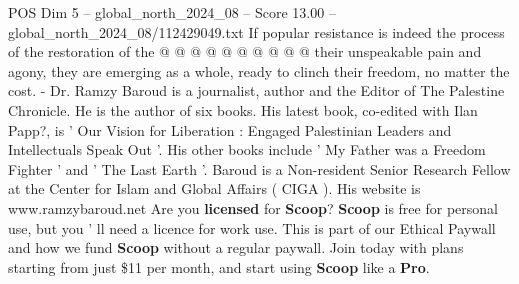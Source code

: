 \begin{textsample}{POS Dim 5 – global\_north\_2024\_08 – Score 13.00 – global\_north\_2024\_08/112429049.txt}
If popular resistance is indeed the process of the restoration of the @ @ @ @ @ @ @ @ @ @ their unspeakable pain and agony, they are emerging as a whole, ready to clinch their freedom, no matter the cost. - Dr.
Ramzy Baroud is a journalist, author and the Editor of The Palestine Chronicle.
He is the author of six books.
His latest book, co-edited with Ilan Papp?, is ' Our Vision for Liberation : Engaged Palestinian Leaders and Intellectuals Speak Out '.
His other books include ' My Father was a Freedom Fighter ' and ' The Last Earth '.
Baroud is a Non-resident Senior Research Fellow at the Center for Islam and Global Affairs ( CIGA ).
His website is www.ramzybaroud.net Are you \textbf{licensed} for \textbf{Scoop}? \textbf{Scoop} is free for personal use, but you ' ll need a licence for work use.
This is part of our Ethical Paywall and how we fund \textbf{Scoop} without a regular paywall.
Join today with plans starting from just \$11 per month, and start using \textbf{Scoop} like a \textbf{Pro}.

\end{textsample}
